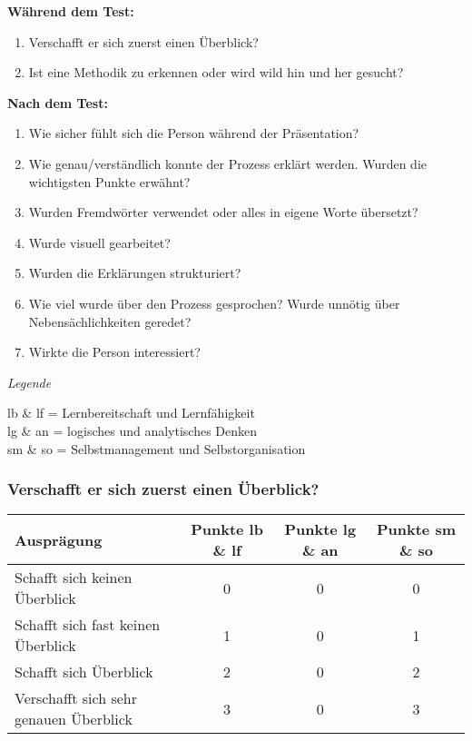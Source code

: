 \textbf{Während dem Test:}
\begin{enumerate}
\item Verschafft er sich zuerst einen Überblick?
\item Ist eine Methodik zu erkennen oder wird wild hin und her gesucht?
\end{enumerate}

\textbf{Nach dem Test:}
\begin{enumerate}
\item Wie sicher fühlt sich die Person während der Präsentation?
\item Wie genau/verständlich konnte der Prozess erklärt werden. Wurden die wichtigsten Punkte erwähnt?
\item Wurden Fremdwörter verwendet oder alles in eigene Worte übersetzt?
\item Wurde visuell gearbeitet?
\item Wurden die Erklärungen strukturiert?
\item Wie viel wurde über den Prozess gesprochen? Wurde unnötig über Nebensächlichkeiten geredet?
\item Wirkte die Person interessiert?
\end{enumerate}
\vspace{3mm}

\textit{Legende}

lb \& lf = Lernbereitschaft und Lernfähigkeit\\
lg \& an = logisches und analytisches Denken \\
sm \& so = Selbstmanagement und Selbstorganisation

\subsubsection{Verschafft er sich zuerst einen Überblick?}
\begin{tabular}{| l | c | c | c |}
  \hline	
  \textbf{Ausprägung} & \textbf{Punkte lb \& lf} & \textbf{Punkte lg \& an} & \textbf{Punkte sm \& so} \\
  \hline  		
  Schafft sich keinen Überblick & 0  & 0 & 0 \\ 
  \hline
  Schafft sich fast keinen Überblick & 1 & 0 & 1 \\ 
  \hline
  Schafft sich Überblick & 2 & 0 & 2 \\
  \hline  
  Verschafft sich sehr genauen Überblick & 3 & 0 &  3 \\
  \hline  
\end{tabular}
  
